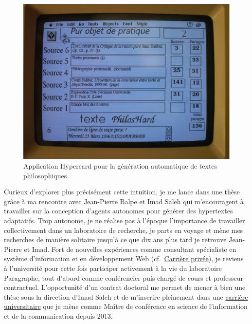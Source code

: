 \documentclass[
  letterpaper,
  DIV=11,
  numbers=noendperiod]{scrreprt}
\begin{document}
\begin{figure}

{\centering \includegraphics{media/1000000100000263000001CB6B57709BAD5234C1.png}

}

\caption{\label{fig-appliHypercard}Application Hypercard pour la
génération automatique de textes philosophiques}

\end{figure}

Curieux d'explorer plus précisément cette intuition, je me lance dans
une thèse grâce à ma rencontre avec Jean-Pierre Balpe et Imad Saleh qui
m'encouragent à travailler sur la conception d'agents autonomes pour
générer des hypertextes adaptatifs. Trop autonome, je ne réalise pas à
l'époque l'importance de travailler collectivement dans un laboratoire
de recherche, je parts en voyage et mène mes recherches de manière
solitaire jusqu'à ce que dix ans plus tard je retrouve Jean-Pierre et
Imad. Fort de nouvelles expériences comme consultant spécialiste en
système d'information et en développement Web
(cf.~\href{http://localhost/samszo/omk/s/fiches/item/300719}{Carrière
privée}), je reviens à l'université pour cette fois participer
activement à la vie du laboratoire Paragraphe, tout d'abord comme
conférencier puis chargé de cours et professeur contractuel.
L'opportunité d'un contrat doctoral me permet de mener à bien une thèse
sous la direction d'Imad Saleh et de m'inscrire pleinement dans une
\href{http://localhost/samszo/omk/s/fiches/item/300716}{carrière
universitaire} que je mène comme Maître de conférence en science de
l'information et de la communication depuis 2013.
\end{document}
